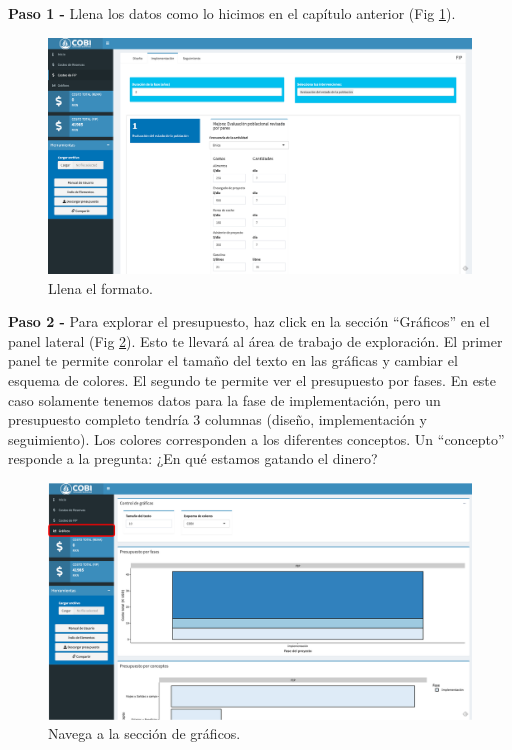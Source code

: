 \documentclass[
]{book}
\begin{document}
\textbf{Paso 1 - } Llena los datos como lo hicimos en el capítulo anterior (Fig \ref{fig:exp-1}).

\begin{figure}
\includegraphics[width=26.67in]{images/exp-1} \caption{Llena el formato.}\label{fig:exp-1}
\end{figure}

\textbf{Paso 2 - } Para explorar el presupuesto, haz click en la sección ``Gráficos'' en el panel lateral (Fig \ref{fig:exp-2}). Esto te llevará al área de trabajo de exploración. El primer panel te permite conrolar el tamaño del texto en las gráficas y cambiar el esquema de colores. El segundo te permite ver el presupuesto por fases. En este caso solamente tenemos datos para la fase de implementación, pero un presupuesto completo tendría 3 columnas (diseño, implementación y seguimiento). Los colores corresponden a los diferentes conceptos. Un ``concepto'' responde a la pregunta: ¿En qué estamos gatando el dinero?

\begin{figure}
\includegraphics[width=61.24in]{images/exp-2} \caption{Navega a la sección de gráficos.}\label{fig:exp-2}
\end{figure}
\end{document}
